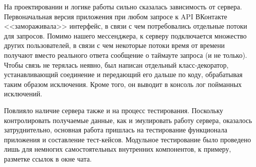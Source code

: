 \documentclass[12pt]{article}
\begin{document}
На проектировании и логике работы сильно сказалась зависимость от сервера. Первоначальная версия приложения при любом запросе к API ВКонтакте <<замораживала>> интерфейс, в связи с чем потребовались отдельные потоки для запросов. Помимо нашего мессенджера, к серверу подключается множество других пользователей, в связи с чем некоторые потоки время от времени получают вместо реального ответа сообщение о таймауте запроса (и не только). Чтобы связь не терялась неявно, был написан отдельный класс-декоратор, устанавливающий соединение и передающий его дальше по коду, обрабатывая таким образом исключения. Кроме того, он выводит в консоль лог пойманных исключений. \newline

Повлияло наличие сервера также и на процесс тестирования. Поскольку контролировать получаемые данные, как и эмулировать работу сервера, оказалось затруднительно, основная работа пришлась на тестирование функционала приложения и составление тест-кейсов. Модульное тестирование было проведено лишь для немногих самостоятельных внутренних компонентов, к примеру, разметке ссылок в окне чата.
\end{document}
